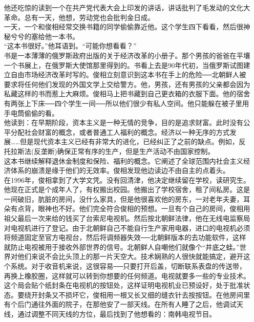 他还吃惊的读到一个在共产党代表大会上印发的讲话，讲话批判了毛发动的文化大革命。总有一天，他想，劳动党也会批判金日成。\\

一天，一个和俊相经常交换书籍的同学偷偷靠近他。这个学生四下看看，然后很神秘兮兮的塞给他一本书。\\

“这本书很好。”他耳语到。“可能你想看看？”\\

书是一本薄薄的俄罗斯政府出版的关于经济改革的小册子。那个男孩的爸爸在平壤一个书展上，在俄罗斯大使馆那里得到的。书看上去是90年代初，当俄罗斯试图建立自由市场经济改革时写的。俊相立刻意识到这本书在手上的危险──北朝鲜人被要求将任何他们发现的外国文学上交给警方。他，男孩，还有男孩的父亲都会因为私藏这样的书而惹上大麻烦。俊相马上把书藏到自己更衣箱的衣服下面。他的宿舍有两张上下床──四个学生一间──所以他们很少有私人空间。他只能躲在被子里用手电筒偷偷的看。\\

他读到：在早期阶段，资本主义是一种无情的竞争，目的是追求财富。此时没有公平分配社会财富的概念，或者普通工人福利的概念。经济以一种无序的方式发展……但是现代资本主义已经有非常大的进化，已经纠正了之前的缺点。例如，反托拉斯法(反垄断)确保正常有序的生产，但是生产活动不由国家控制。\\

这本书继续解释退休金制度和保险、福利的概念。它阐述了全球范围内社会主义经济体系的崩溃是缘于他们的无效率。俊相发现他边读边不由自主的点着头。\\

在1996年，俊相拿到了大学文凭。没有回清津，他决定继续留在学校，读研究生。他现在正式是个成年人了，有权搬出校园。他搬出了学校宿舍，租了间私房。这是一间破旧，肮脏的房间，没什么家具，但是他很喜欢他的房东，一对老年夫妻，耳朵有点背，眼神也不好。他们完全符合俊相的预想。一旦有个自己的房间，俊相用祖父最后一次来给的钱买了台索尼电视机。然后按北朝鲜法律，他在无线电监察局对电视机进行了登记。由于北朝鲜自己不能自行生产家用电器，进口的电视机必须将频道固定至官方电视台，然后将调频器失效──北朝鲜版本的去功能软件，这样就防止电视被用于接收外部世界的信号。北朝鲜人自嘲他们就像个“井底之蛙。”世界对他们来说不会比头顶上的那一片天空大。技术娴熟的人很快就能搞定，避开这个系统。对于收音机来说，这很容易──只要打开后盖，切断联系表盘的传送带，再换上橡胶圈，这样就可以转到你想要的任何频道。电视就要多一些的专业技术。\\

这个局会贴个纸封条在电视机的按钮处，这样证明电视机业已预设好，处于批准状态。要绕开封条又不损坏它，俊相用一根又长又细的缝衣针去按按钮。在他房间里有个后门通往外面的院子，在那他安了一部天线。在所有人睡了之后，他调试天线，通过调整不同天线的方位，最后找到了他想看的：南韩电视节目。\\

